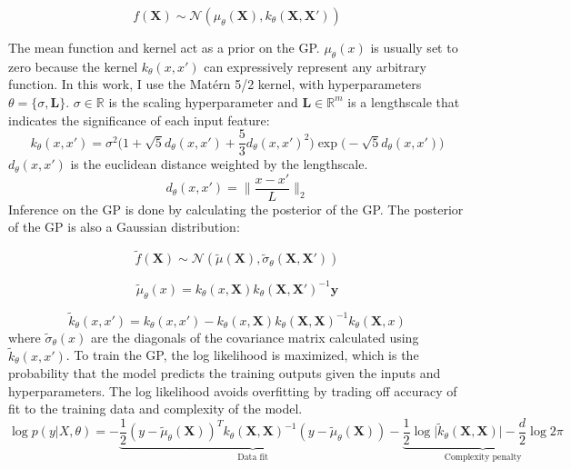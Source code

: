 \begin{equation}
    f(\mathbf X) \sim \mathcal N(\mu_{\theta}(\mathbf X), k_{\theta}(\mathbf X, \mathbf X'))
\end{equation}

The mean function and kernel act as a prior on the GP.  $\mu_{\theta}(x)$ is usually set to zero because the kernel  $k_{\theta}(x, x')$ can expressively represent any arbitrary function. In this work, I use the Matérn 5/2 kernel, with hyperparameters $\theta=\{\sigma,\mathbf L \}$. $\sigma \in \mathbb R$ is the scaling hyperparameter and $\mathbf L \in \mathbb R^m$ is a lengthscale that indicates the significance of each input feature:
\begin{equation}
    k_{\theta}(x, x') = \sigma^2 \biggl(1 + \sqrt{5}d_{\theta}(x,x')+\frac{5}{3}d_{\theta}(x,x')^2\biggr)\exp\biggl(-\sqrt{5}d_{\theta}(x,x') \biggr)
\end{equation}
$d_{\theta}(x,x')$ is the euclidean distance weighted by the lengthscale.
\begin{equation}
    d_{\theta}(x,x')=\biggl\lVert \frac{x-x'}{L} \biggr\rVert_2
\end{equation}
Inference on the GP is done by calculating the posterior of the GP. The posterior of the GP is also a Gaussian distribution:

\begin{equation}
     \tilde f(\mathbf X) \sim \mathcal N(\tilde \mu(\mathbf X), \tilde \sigma_{\theta}(\mathbf X, \mathbf X'))
\end{equation}

\begin{equation}
    \tilde \mu_{\theta}(x) = k_{\theta}(x, \mathbf X)k_{\theta}(\mathbf X, \mathbf X')^{-1} \mathbf y
\end{equation}

\begin{equation}
    \tilde k_{\theta}(x,x') = k_{\theta}( x, x')-k_{\theta}(x, \mathbf X) k_{\theta}(\mathbf X, \mathbf X)^{-1}k_{\theta}(\mathbf X, x)
\end{equation}
where $\tilde \sigma_{\theta}(x)$ are the diagonals of the covariance matrix calculated using $\tilde k_{\theta}(x, x')$.
To train the GP, the log likelihood is maximized, which is the probability that the model predicts the training outputs given the inputs and hyperparameters. The log likelihood avoids overfitting by trading off accuracy of fit to the training data and complexity of the model.
\begin{equation}
    \log p(y \vert X, \theta) = -\underbrace{\frac{1}{2}(y-\tilde \mu_{\theta}(\mathbf X))^T k_{\theta}(\mathbf X, \mathbf X)^{-1}(y- \tilde\mu_{\theta}(\mathbf X)) }_{\text{Data  fit}}- \underbrace{\frac{1}{2} \log{\vert \tilde k_{\theta}(\mathbf X, \mathbf X) \vert} - \frac{d}{2}\log{2 \pi}}_{\text{Complexity penalty}}
\end{equation}

